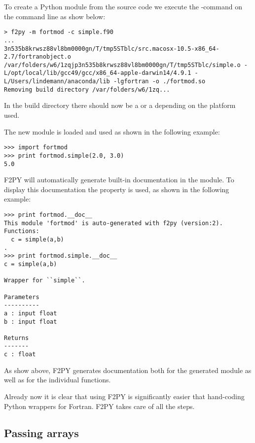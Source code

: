 To create a Python module from the source code we execute the -command on the command line as show below:

\cmmode

\begin{lstlisting}
> f2py -m fortmod -c simple.f90
...
3n535b8krwsz88vl8bm0000gn/T/tmp5STblc/src.macosx-10.5-x86_64-2.7/fortranobject.o /var/folders/w6/1zqjp3n535b8krwsz88vl8bm0000gn/T/tmp5STblc/simple.o -L/opt/local/lib/gcc49/gcc/x86_64-apple-darwin14/4.9.1 -L/Users/lindemann/anaconda/lib -lgfortran -o ./fortmod.so
Removing build directory /var/folders/w6/1zq...
\end{lstlisting}

In the build directory there should now be a  or a  depending on the platform used.

The new module is loaded and used as shown in the following example:

\pymode

\begin{lstlisting}
>>> import fortmod
>>> print fortmod.simple(2.0, 3.0)
5.0
\end{lstlisting}

F2PY will automatically generate built-in documentation in the module. To display this documentation the  property is used, as shown in the following example:

\begin{lstlisting}
>>> print fortmod.__doc__
This module 'fortmod' is auto-generated with f2py (version:2).
Functions:
  c = simple(a,b)
.
>>> print fortmod.simple.__doc__
c = simple(a,b)

Wrapper for ``simple``.

Parameters
----------
a : input float
b : input float

Returns
-------
c : float
\end{lstlisting}

As show above, F2PY generates documentation both for the generated module as well as for the individual functions.

Already now it is clear that using F2PY is significantly easier that hand-coding Python wrappers for Fortran. F2PY takes care of all the steps. 

\subsection{Passing arrays}

